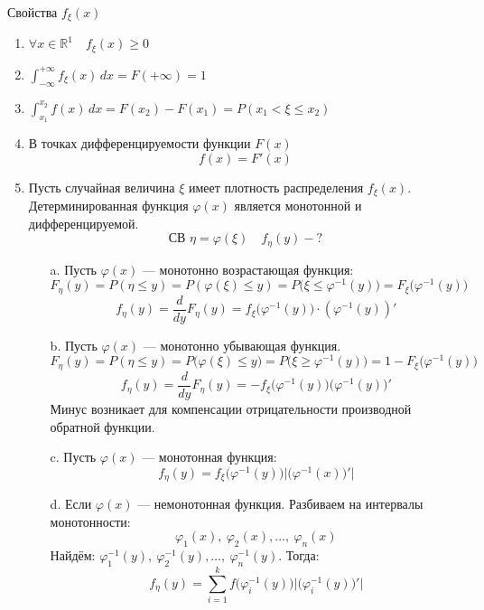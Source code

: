 \documentclass[12pt, a4paper]{article}
\begin{document}
    \begin{center}
        Свойства $f_{\xi}(x)$
    \end{center}
    \begin{enumerate}
        \item $\forall x\in \mathbb{R}^1\quad f_{\xi}(x) \geq 0$
        \item $\displaystyle \int_{-\infty}^{+\infty} f_{\xi}(x)\, dx = F(+\infty) = 1$
        \item $\displaystyle \int_{x_1}^{x_2} f(x)\, dx = F(x_2) - F(x_1) = P(x_1 < \xi \leq x_2)$
        \item В точках дифференцируемости функции $F(x)$
        \[f(x) = F'(x)\]
        \item Пусть случайная величина $\xi$ имеет плотность распределения $f_{\xi}(x)$. Детерминированная функция $\varphi(x)$ является монотонной и дифференцируемой.
        \[\text{СВ } \eta = \varphi(\xi)\quad f_{\eta}(y) - ?\]
        \begin{enumerate}
            \item[a.] Пусть $\varphi(x)$ --- монотонно возрастающая функция:
            \[F_{\eta}(y) = P(\eta \leq y) = P(\varphi(\xi) \leq y) = P\big(\xi \leq \varphi^{-1}(y)\big) = F_{\xi}\big(\varphi^{-1}(y)\big)\]
            \[f_{\eta}(y) = \frac{d}{dy} F_{\eta}(y) = f_{\xi}\big(\varphi^{-1}(y) \big)\cdot (\varphi^{-1}(y))'\]
            \item[b.] Пусть $\varphi(x)$ --- монотонно убывающая функция.
            \[F_{\eta}(y) = P(\eta \leq y) = P\big(\varphi(\xi) \leq y\big) = P\big(\xi \geq \varphi^{-1}(y)\big) = 1 - F_{\xi}\big(\varphi^{-1}(y)\big)\]
            \[f_{\eta}(y) = \frac{d}{dy} F_{\eta}(y) = - f_{\xi}\big( \varphi^{-1}(y) \big) \big( \varphi^{-1}(y) \big)'\]
            Минус возникает для компенсации отрицательности производной обратной функции.
            \item[c.] Пусть $\varphi(x)$ --- монотонная функция:
            \[f_{\eta}(y) = f_{\xi}\big(\varphi^{-1}(y)\big) \Big| \big( \varphi^{-1}(x) \big)' \Big|\]
            \item[d.] Если $\varphi(x)$ --- немонотонная функция. Разбиваем на интервалы монотонности:
            \[\varphi_1(x),\ \varphi_2(x),\dots,\ \varphi_n(x)\]
            Найдём: $\varphi_1^{-1}(y),\ \varphi_2^{-1}(y),\dots,\ \varphi_n^{-1}(y)$. Тогда:
            \[f_{\eta}(y) = \sum_{i = 1}^{k} f\big( \varphi_i^{-1}(y) \big) \Big|\big( \varphi_i^{-1}(y) \big)'\Big|\]
        \end{enumerate}
    \end{enumerate}
\end{document}
